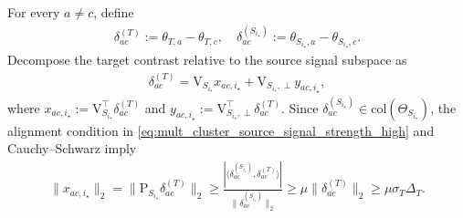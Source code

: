 \documentclass[10pt]{article}
\newcommand{\ip}[2]{\langle #1,#2\rangle}
\newcommand{\col}{\mathrm{col}}
\newcommand{\trg}{T}
\newcommand{\sigmaT}{\sigma_{\trg}}
\newcommand{\thetamcT}[1]{\theta_{\trg,#1}}
\newcommand{\DeltaT}{\Delta_{\trg}}
\newcommand{\src}{S}
\newcommand{\thetamSS}[2]{\theta_{\src_{#1},#2}}
\newcommand{\ThetamS}[1]{\Theta_{\src_{#1}}}
\begin{document}
For every $a\neq c$, define
\begin{align}
    \delta_{ac}^{(\trg)}:=\thetamcT{a}-\thetamcT{c}, \quad \delta_{ac}^{(\src_{i_\star})}:=\thetamSS{i_\star}{a}-\thetamSS{i_\star}{c}.
\end{align}
Decompose the target contrast relative to the source signal subspace as
\begin{align}
\label{eq:source_low_dim_target_decomp}
    \delta_{ac}^{(\trg)}=\mathrm V_{\src_{i_\star}}x_{ac,i_\star}+\mathrm V_{\src_{i_\star},\perp}y_{ac,i_\star},
\end{align}
where $x_{ac,i_\star}:=\mathrm V_{\src_{i_\star}}^\top\delta_{ac}^{(\trg)}$ and $y_{ac,i_\star}:=\mathrm V_{\src_{i_\star},\perp}^\top\delta_{ac}^{(\trg)}$. Since $\delta_{ac}^{(\src_{i_\star})}\in\col(\ThetamS{i_\star})$, the alignment condition in \eqref{eq:mult_cluster_source_signal_strength_high} and Cauchy--Schwarz imply
\begin{align}
\label{eq:source_low_dim_oracle_projection_lower}
    \|x_{ac,i_\star}\|_2=\|\mathrm P_{\src_{i_\star}}\delta_{ac}^{(\trg)}\|_2\ge \frac{|\ip{\delta_{ac}^{(\src_{i_\star})}}{\delta_{ac}^{(\trg)}}|}{\|\delta_{ac}^{(\src_{i_\star})}\|_2}\ge \mu\|\delta_{ac}^{(\trg)}\|_2\ge \mu\sigmaT\DeltaT.
\end{align}
\end{document}
